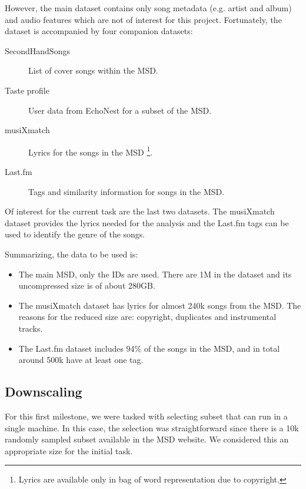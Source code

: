 \documentclass[10pt,a4paper]{scrartcl}
\begin{document}
    However, the main dataset contains only song metadata
    (e.g. artist and album) and audio features which are not of interest
    for this project. Fortunately, the dataset is accompanied by four companion
    datasets:
    
    \begin{description}
      \item[SecondHandSongs] List of cover songs within the MSD.
      \item[Taste profile] User data from EchoNest for a subset of the MSD.
      \item[musiXmatch] Lyrics for the songs in the MSD
                        \footnote{Lyrics are available only in bag of word
                                  representation due to copyright.}.
      \item[Last.fm] Tags and similarity information for songs in the MSD.
    \end{description}
    
    Of interest for the current task are the last two datasets. The musiXmatch
    dataset provides the lyrics needed for the analysis and the Last.fm tags can
    be used to identify the genre of the songs.
    
    Summarizing, the data to be used is:
    
    \begin{itemize}
      \item The main MSD, only the IDs are used. There are 1M in the
            dataset and its uncompressed size is of about 280GB.
      \item The musiXmatch dataset has lyrics for almost 240k songs from the
            MSD. The reasons for the reduced size are: copyright, duplicates and
            instrumental tracks.
      \item The Last.fm dataset includes 94\% of the songs in the MSD, and in
            total around 500k have at least one tag.
    \end{itemize}

    \subsection{Downscaling}
    For this first milestone, we were tasked with selecting subset that can
    run in a single machine. In this case, the selection was straightforward
    since there is a 10k randomly sampled subset available in the MSD website.
    We considered this an appropriate size for the initial task.
    
\end{document}
